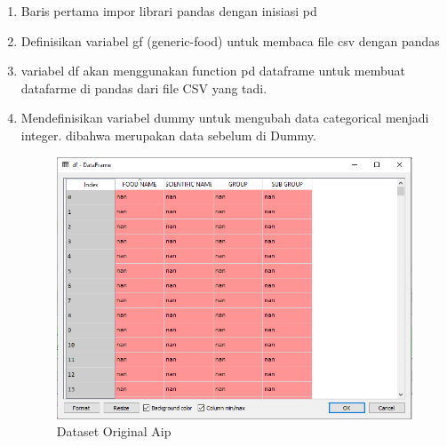 \begin{enumerate}
\item Baris pertama impor librari pandas dengan inisiasi pd
\item Definisikan variabel gf (generic-food) untuk membaca file csv dengan pandas
\item variabel df akan menggunakan function pd dataframe untuk membuat datafarme di pandas dari file CSV yang tadi.
\item Mendefinisikan variabel dummy untuk mengubah data categorical menjadi integer. dibahwa merupakan data sebelum di Dummy. 
\begin{figure}[!hbtp]
\centering
\includegraphics[scale=0.5]{figures/AIP/c2.PNG}
\caption{Dataset Original Aip}
\label{Aplikasi Pandas}
\end{figure}


\end{enumerate}

